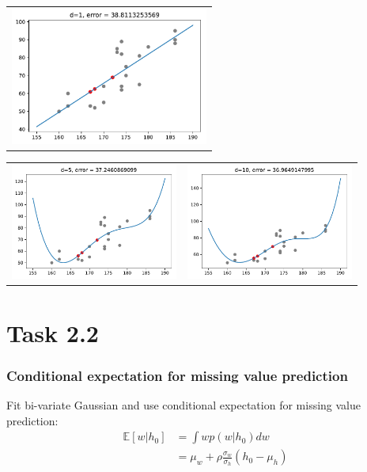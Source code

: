 \documentclass{beamer}
\begin{document}
\begin{frame}
\centering
\begin{tabular}{c}
	\includegraphics[width=6.5cm]{graphics/poly_1_coeffs}
\end{tabular}

\vspace{0.01em}
\begin{tabular}{cc}
	\includegraphics[width=5.5cm]{graphics/poly_5_coeffs}
	&
	\includegraphics[width=5.5cm]{graphics/poly_10_coeffs}
\end{tabular}
\end{frame}

\section{Task 2.2}

\begin{frame}
	\frametitle{Conditional expectation for missing value prediction}
	Fit bi-variate Gaussian and use conditional expectation for missing value prediction:
	\begin{align*}
		\mathbb{E}[w|h_0] &= \int w p(w|h_0) dw \\
						  &= \mu_w + \rho \frac{\sigma_w}{\sigma_h}(h_0-\mu_h)
	\end{align*}
\end{frame}
\end{document}
